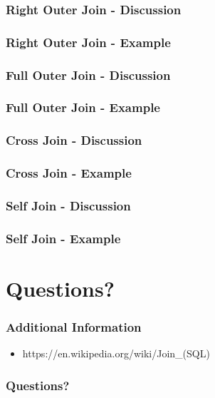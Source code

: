 \documentclass{beamer}
\begin{document}
\begin{frame}
  \frametitle{Right Outer Join - Discussion}
  
\end{frame}

\begin{frame}
  \frametitle{Right Outer Join - Example}
  
\end{frame}

\begin{frame}
  \frametitle{Full Outer Join - Discussion}
  
\end{frame}

\begin{frame}
  \frametitle{Full Outer Join - Example}
  
\end{frame}

\begin{frame}
  \frametitle{Cross Join - Discussion}
  
\end{frame}

\begin{frame}
  \frametitle{Cross Join - Example}
  
\end{frame}

\begin{frame}
  \frametitle{Self Join - Discussion}
  
\end{frame}

\begin{frame}
  \frametitle{Self Join - Example}
  
\end{frame}


\section{Questions?}

\begin{frame}
  \frametitle{Additional Information}
  \begin{itemize}
  \item https://en.wikipedia.org/wiki/Join\_(SQL)
  \end{itemize}
\end{frame}

\begin{frame}
 \frametitle{Questions?}

\end{frame}
\end{document}
